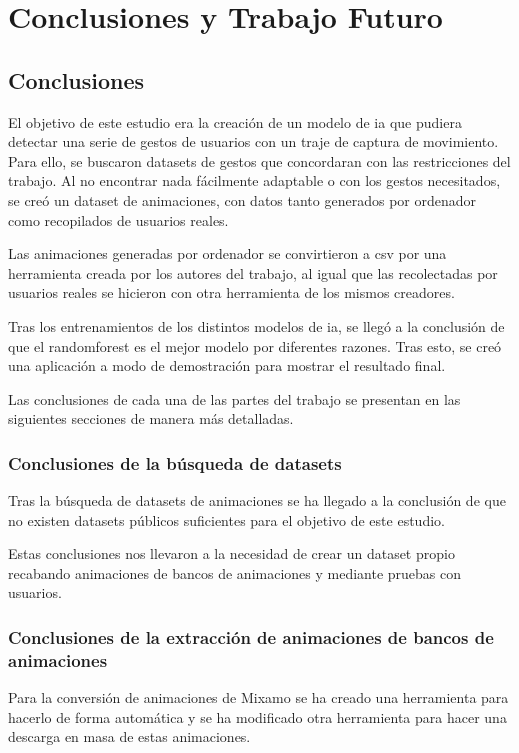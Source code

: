 \chapter{Conclusiones y Trabajo Futuro}
\label{cap:conclusiones}

\section{Conclusiones}

El objetivo de este estudio era la creación de un modelo de \gls{ia} que pudiera detectar una serie de gestos de usuarios con un traje de captura de movimiento. Para ello, se buscaron datasets de gestos que concordaran con las restricciones del trabajo. Al no encontrar nada fácilmente adaptable o con los gestos necesitados, se creó un dataset de animaciones, con datos tanto generados por ordenador como recopilados de usuarios reales.

Las animaciones generadas por ordenador se convirtieron a \gls{csv} por una herramienta creada por los autores del trabajo, al igual que las recolectadas por usuarios reales se hicieron con otra herramienta de los mismos creadores.

Tras los entrenamientos de los distintos modelos de \gls{ia}, se llegó a la conclusión de que el \gls{randomforest} es el mejor modelo por diferentes razones. Tras esto, se creó una aplicación a modo de demostración para mostrar el resultado final.

Las conclusiones de cada una de las partes del trabajo se presentan en las siguientes secciones de manera más detalladas.

\subsection{Conclusiones de la búsqueda de datasets}
Tras la búsqueda de datasets de animaciones se ha llegado a la conclusión de que no existen datasets públicos suficientes para el objetivo de este estudio.

Estas conclusiones nos llevaron a la necesidad de crear un dataset propio recabando animaciones de bancos de animaciones y mediante pruebas con usuarios.

\subsection{Conclusiones de la extracción de animaciones de bancos de animaciones}
Para la conversión de animaciones de Mixamo se ha creado una herramienta para hacerlo de forma automática y se ha modificado otra herramienta para hacer una descarga en masa de estas animaciones.

